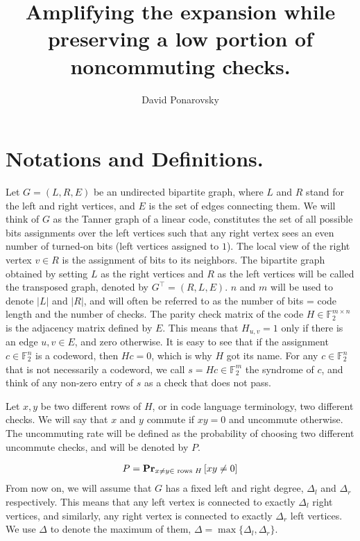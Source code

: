 \documentclass[manuscript,screen,review]{acmart}
\begin{document}

\title{ Amplifying the expansion while preserving a low portion of noncommuting checks. }
\author{David Ponarovsky}
\maketitle

\section{Notations and Definitions.}
Let $G=(L,R,E)$ be an undirected bipartite graph, where $L$ and $R$ stand for the left and right vertices, and $E$ is the set of edges connecting them. We will think of $G$ as the Tanner graph of a linear code, constitutes the set of all possible bits assignments over the left vertices such that any right vertex sees an even number of turned-on bits (left vertices assigned to $1$). The local view of the right vertex $v \in R$ is the assignment of bits to its neighbors. The bipartite graph obtained by setting $L$ as the right vertices and $R$ as the left vertices will be called the transposed graph, denoted by $G^{\top} = (R,L,E)$. $n$ and $m$ will be used to denote $|L|$ and $|R|$, and will often be referred to as the number of bits = code length and the number of checks.
The parity check matrix of the code $H \in \mathbb{F}_2^{m \times n}$ is the adjacency matrix defined by $E$. This means that $H_{u,v} = 1$ only if there is an edge ${u,v} \in E$, and zero otherwise. It is easy to see that if the assignment $c \in \mathbb{F}_{2}^{n}$ is a codeword, then $Hc = 0$, which is why $H$ got its name. For any $c \in \mathbb{F}_{2}^{n}$ that is not necessarily a codeword, we call $s = Hc \in \mathbb{F}_{2}^{m}$ the syndrome of $c$, and think of any non-zero entry of $s$ as a check that does not pass.

Let $x,y$ be two different rows of $H$, or in code language terminology, two different checks. We will say that $x$ and $y$ commute if $xy = 0$ and uncommute otherwise. The uncommuting rate will be defined as the probability of choosing two different uncommute checks, and will be denoted by $P$.

\begin{equation*}
  \begin{split}
     P =  \prbm{ xy \neq 0 }{x\neq y \in \text{ rows } H } 
  \end{split}
\end{equation*}
From now on, we will assume that $G$ has a fixed left and right degree, $\Delta_{l}$ and $\Delta_{r}$ respectively. This means that any left vertex is connected to exactly $\Delta_{l}$ right vertices, and similarly, any right vertex is connected to exactly $\Delta_{r}$ left vertices. We use $\Delta$ to denote the maximum of them, $\Delta = \max \{ \Delta_{l}, \Delta_{r} \}$. 
\end{document}
